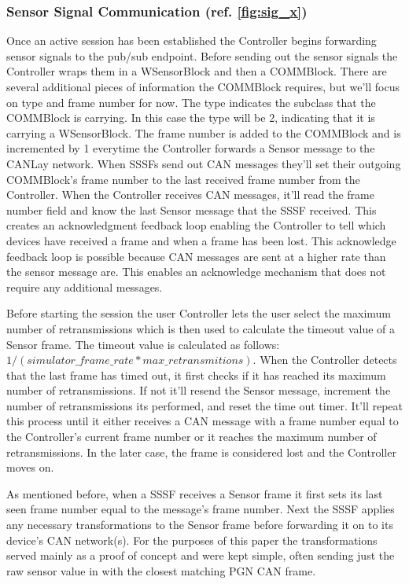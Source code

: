 \documentclass[letterpaper,twocolumn,12pt]{article}
\begin{document}
\subsubsection{Sensor Signal Communication (ref. \ref{fig:sig_x})} \label{sec:sig_x}


Once an active session has been established the Controller begins forwarding sensor signals to the pub/sub endpoint. Before sending out the sensor signals the Controller wraps them in a WSensorBlock and then a COMMBlock. There are several additional pieces of information the COMMBlock requires, but we'll focus on type and frame number for now. The type indicates the subclass that the COMMBlock is carrying. In this case the type will be 2, indicating that it is carrying a WSensorBlock. The frame number is added to the COMMBlock and is incremented by 1 everytime the Controller forwards a Sensor message to the CANLay network. When SSSFs send out CAN messages they’ll set their outgoing COMMBlock's frame number to the last received frame number from the Controller. When the Controller receives CAN messages, it'll read the frame number field and know the last Sensor message that the SSSF received. This creates an acknowledgment feedback loop enabling the Controller to tell which devices have received a frame and when a frame has been lost. This acknowledge feedback loop is possible because CAN messages are sent at a higher rate than the sensor message are. This enables an acknowledge mechanism that does not require any additional messages.

Before starting the session the user Controller lets the user select the maximum number of retransmissions which is then used to calculate the timeout value of a Sensor frame. The timeout value is calculated as follows: $1/(simulator\_frame\_rate * max\_retransmitions)$. When the Controller detects that the last frame has timed out, it first checks if it has reached its maximum number of retransmissions. If not it'll resend the Sensor message, increment the number of retransmissions its performed, and reset the time out timer. It’ll repeat this process until it either receives a CAN message with a frame number equal to the Controller's current frame number or it reaches the maximum number of retransmissions. In the later case, the frame is considered lost and the Controller moves on.

As mentioned before, when a SSSF receives a Sensor frame it first sets its last seen frame number equal to the message's frame number. Next the SSSF applies any necessary transformations to the Sensor frame before forwarding it on to its device's CAN network(s). For the purposes of this paper the transformations served mainly as a proof of concept and were kept simple, often sending just the raw sensor value in with the closest matching PGN CAN frame.
\end{document}
